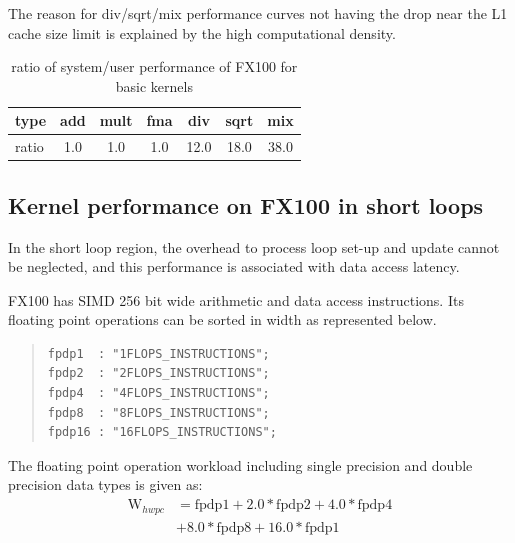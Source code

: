 \documentclass[conference]{IEEEtran}
\begin{document}
The reason for div/sqrt/mix performance curves not having the drop near
the L1 cache size limit is explained by the high computational density.
\begin{table}[b]
\centering
\caption{ratio of system/user performance of FX100 for basic kernels}
\label{tab:ratio-system-user-fx100}
\begin{tabular}{l|c|c|c|c|c|c} \hline
type &	add	&	mult &	fma &	div &	sqrt &	mix \\ \hline
ratio &	1.0 &	1.0 &	1.0 &	12.0 &	18.0 &	38.0 \\ \hline 	
\end{tabular}
\end{table}


\subsection{Kernel performance on FX100 in short loops}
\label{subsection:short-kernels-fx100}

In the short loop region,
the overhead to process loop set-up and update cannot be neglected,
and this performance is associated with data access latency.

FX100 has SIMD 256 bit wide arithmetic and data access instructions.
Its floating point operations can be sorted in width as represented below.
\begin{quote}
\begin{small}
\begin{verbatim}
fpdp1  : "1FLOPS_INSTRUCTIONS";
fpdp2  : "2FLOPS_INSTRUCTIONS";
fpdp4  : "4FLOPS_INSTRUCTIONS";
fpdp8  : "8FLOPS_INSTRUCTIONS";
fpdp16 : "16FLOPS_INSTRUCTIONS";
\end{verbatim}
\end{small}
\end{quote}
The floating point operation workload including single precision
and double precision data types is given as:
\begin{align}
	\mathrm{W}_{hwpc} & = \mathrm{fpdp1} + 2.0*\mathrm{fpdp2} + 4.0*\mathrm{fpdp4} \nonumber \\
			& + 8.0*\mathrm{fpdp8} + 16.0*\mathrm{fpdp1} 
\end{align}
\end{document}
